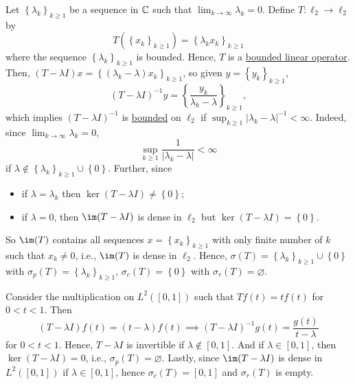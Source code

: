 \begin{eg}
	Let \(\left\{ \lambda _k \right\} _{k \geq 1}\) be a sequence in \(\mathbb{\MakeUppercase{c}} \) such that \(\lim_{k \to \infty} \lambda _k = 0\). Define \(T\colon \ell _2 \to \ell _2\) by
	\[
		T(\left\{ x_k \right\} _{k\geq 1})= \left\{ \lambda_k x_k \right\} _{k\geq 1}
	\]
	where the sequence \(\left\{ \lambda _k \right\} _{k\geq 1}\) is bounded. Hence, \(T\) is a \hyperref[def:bounded-linear-op]{bounded linear operator}. Then, \((T-\lambda I) x = \left\{ (\lambda _k - \lambda )x_k \right\} _{k\geq 1}\), so given \(y = \left\{ y_k \right\} _{k\geq 1}\),
	\[
		(T-\lambda I)^{-1} y = \left\{ \frac{y_k}{\lambda _k - \lambda } \right\} _{k\geq 1},
	\]
	which implies \((T-\lambda I)^{-1} \) is \hyperref[rmk:bounded-op]{bounded} on \(\ell _2\) if \(\sup _{k\geq 1} \vert \lambda _k - \lambda \vert ^{-1} < \infty \). Indeed, since \(\lim_{k \to \infty} \lambda _k = 0\),
	\[
		\sup _{k\geq 1} \frac{1}{\vert \lambda _k - \lambda  \vert }< \infty
	\]
	if \(\lambda \notin \left\{ \lambda _k \right\}_{k\geq 1} \cup \left\{ 0 \right\}\). Further, since
	\begin{itemize}
		\item if \(\lambda =\lambda _k\) then \(\ker(T - \lambda I) \neq \left\{ 0 \right\} \);
		\item if \(\lambda=0\), then \(\im(T - \lambda I)\) is dense in \(\ell _2\) but \(\ker(T-\lambda I) = \left\{ 0 \right\} \).
	\end{itemize}

	So \(\im(T)\) contains all sequences \(x = \left\{ x_k \right\} _{k\geq 1}\) with only finite number of \(k\) such that \(x_k \neq 0\), i.e., \(\im(T)\) is dense in \(\ell _2\). Hence, \(\sigma (T) = \left\{ \lambda _k \right\}_{k\geq 1} \cup \left\{ 0 \right\}\) with \(\sigma _p(T) = \left\{ \lambda _k \right\}_{k\geq 1} \), \(\sigma _c(T) = \left\{ 0 \right\} \) with \(\sigma _r(T) = \varnothing \).
\end{eg}

\begin{eg}
	Consider the multiplication on \(L^2([0, 1])\) such that \(Tf(t) = tf(t)\) for \(0 < t < 1\). Then
	\[
		(T-\lambda I)f(t) = (t - \lambda )f(t) \implies (T-\lambda I)^{-1} g(t) = \frac{g(t)}{t - \lambda }
	\]
	for \(0 < t < 1\). Hence, \(T-\lambda I\) is invertible if \(\lambda \notin [0, 1]\). And if \(\lambda \in [0, 1]\), then \(\ker(T - \lambda I) = 0\), i.e., \(\sigma _p(T)=\varnothing \). Lastly, since \(\im(T-\lambda I)\) is dense in \(L^2([0, 1])\) if \(\lambda \in [0, 1]\), hence \(\sigma _c(T) = [0, 1]\) and \(\sigma _r(T)\) is empty.
\end{eg}

